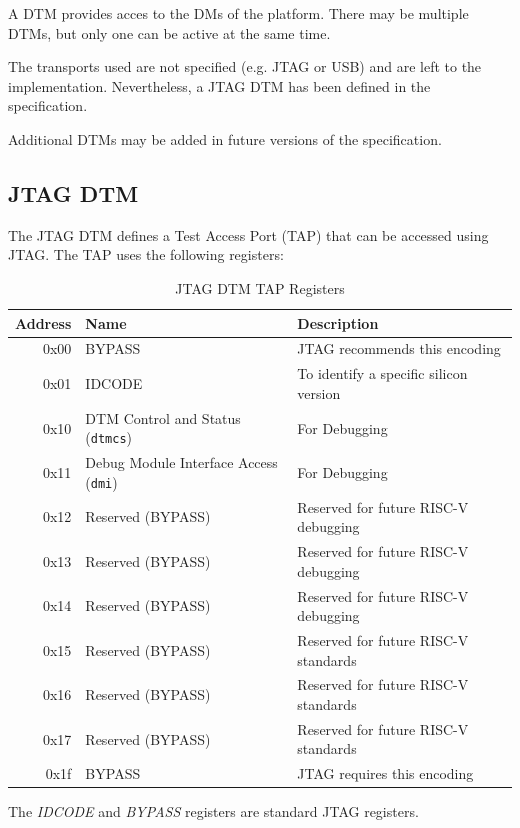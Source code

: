 \documentclass{article}
\begin{document}
	A DTM provides acces to the DMs of the platform. There may be multiple DTMs, but only one can be active at the same time.
	
	The transports used are not specified (e.g. JTAG or USB) and are left to the implementation. Nevertheless, a JTAG DTM has been defined in the specification.
	
	Additional DTMs may be added in future versions of the specification.
	
	\subsection{JTAG DTM}
	
	The JTAG DTM defines a Test Access Port (TAP) that can be accessed using JTAG. The TAP uses the following registers:
	
	\begin{table}[H]
		\begin{center}
			\caption{JTAG DTM TAP Registers}
			\label{dtmTable:jtagregisters}
			\begin{tabular}{|r|l|l|}
			\hline
			Address & Name & Description\\
			\hline
0x00 & BYPASS & JTAG recommends this encoding \\
0x01 & IDCODE & To identify a specific silicon version \\
0x10 & DTM Control and Status ({\tt dtmcs}) & For Debugging\\
0x11 & Debug Module Interface Access ({\tt dmi}) & For Debugging\\
0x12 & Reserved (BYPASS) & Reserved for future RISC-V debugging \\
0x13 & Reserved (BYPASS) & Reserved for future RISC-V debugging \\
0x14 & Reserved (BYPASS) & Reserved for future RISC-V debugging \\
0x15 & Reserved (BYPASS) & Reserved for future RISC-V standards \\
0x16 & Reserved (BYPASS) & Reserved for future RISC-V standards \\
0x17 & Reserved (BYPASS) & Reserved for future RISC-V standards \\
0x1f & BYPASS & JTAG requires this encoding \\
			\hline
			\end{tabular}
		\end{center}
	\end{table}
	
	The \textit{IDCODE} and \textit{BYPASS} registers are standard JTAG registers.
	
\end{document}

